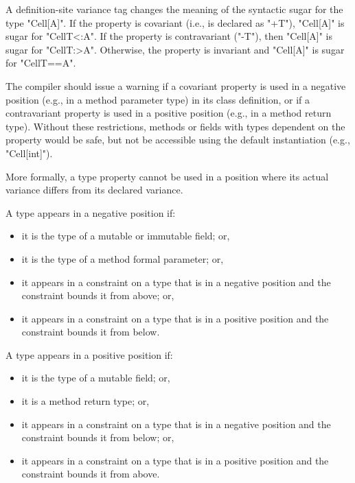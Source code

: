 \documentclass[preprint,nocopyrightspace,9pt]{sigplanconf}
\begin{document}
A definition-site variance tag changes the meaning of the
syntactic sugar for the type \xcd"Cell[A]".
If the property is covariant (i.e., is declared as \xcd"+T"), \xcd"Cell[A]"
is sugar for \xcd"Cell{T<:A}".
If the property is contravariant (\xcd"-T"), then \xcd"Cell[A]"
is sugar for \xcd"Cell{T:>A}".
Otherwise, the property is invariant and \xcd"Cell[A]"
is sugar for \xcd"Cell{T==A}".

The compiler should issue a warning if
a covariant property is used in a negative position (e.g., in a
method parameter type)
in its class definition,
or if a contravariant property is used in a positive position
(e.g., in a method return type).
Without these restrictions, methods or fields with types
dependent on the property would be safe, but not be accessible
using the default instantiation (e.g., \xcd"Cell[int]").

More formally, a type property cannot be used in a position
where its actual variance differs from its declared variance.




\infrule{
\vdash_{+}
}{}
\fi

%
A type appears in a negative position if:
\begin{itemize}
\item it is the type of a mutable or immutable field; or,
\item it is the type of a method formal parameter; or,
\item it appears in a constraint on a type that is in a negative position
and the constraint bounds it from above; or,
\item it appears in a constraint on a type that is in a positive position
and the constraint bounds it from below.
\end{itemize}
%
A type appears in a positive position if:
\begin{itemize}
\item it is the type of a mutable field; or,
\item it is a method return type; or,
\item it appears in a constraint on a type that is in a negative position
and the constraint bounds it from below; or,
\item it appears in a constraint on a type that is in a positive position
and the constraint bounds it from above.
\end{itemize}
\fi
\end{document}

